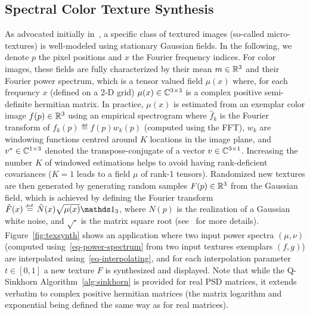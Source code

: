 

\subsection{Spectral Color Texture Synthesis}

As advocated initially in~\cite{galerne2011random}, a specific class of textured images (so-called micro-textures) is well-modeled using stationary Gaussian fields. In the following, we denote $p$ the pixel positions and $x$ the Fourier frequency indices. For color images, these fields are fully characterized by their mean $m \in \mathbb{R}^3$ and their Fourier power spectrum, which is a tensor valued field $\mu(x)$ where, for each frequency $x$ (defined on a 2-D grid) $\mu(x) \in \mathbb{C}^{3 \times 3}$ is a complex positive semi-definite hermitian matrix. 
%
In practice, $\mu(x)$ is estimated from an exemplar color image $f(p) \in \mathbb{R}^3$ using an empirical spectrogram 
where $\hat f_k$ is the Fourier transform of $f_k(p) \eqdef f(p) w_k(p)$ (computed using the FFT), $w_k$ are windowing functions centred around $K$ locations in the image plane, and $v^* \in \mathbb{C}^{1 \times 3}$ denoted the transpose-conjugate of a vector $v \in \mathbb{C}^{3 \times 1}$. 
%
Increasing the number $K$ of windowed estimations helps to avoid having rank-deficient covariances ($K=1$ leads to a field $\mu$ of rank-1 tensors).
%
Randomized new textures are then generated by generating random samples $F(p) \in \mathbb{R}^3$ from the Gaussian field, which is achieved by defining the Fourier transform $\hat F(x) \eqdef \hat N(x) \sqrt{\mu(x)} \ones_3$, where $N(p)$ is the realization of a Gaussian white noise, and $\sqrt{\cdot}$ is the matrix square root (see~\cite{galerne2011random} for more details).
%
Figure~\ref{fig:texsynth} shows an application where two input power spectra $(\mu,\nu)$ (computed using~\eqref{eq-power-spectrum} from two input textures exemplars $(f,g)$)  are interpolated using~\eqref{eq-interpolating}, and for each interpolation parameter $t \in [0,1]$ a new texture $F$ is synthesized and displayed.
%
Note that while the Q-Sinkhorn Algorithm~\ref{alg:sinkhorn} is provided for real PSD matrices, it extends verbatim to complex positive hermitian matrices (the matrix logarithm and exponential being defined the same way as for real matrices).



